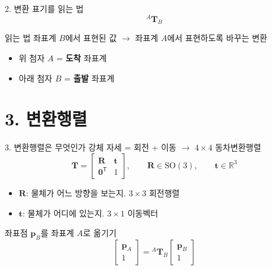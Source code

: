 \documentclass[aspectratio=169,11pt]{beamer}
\begin{document}
\begin{frame}{2. 변환 표기를 읽는 법}
  \[
    {}^{A}\mathbf{T}_{B}
  \]
  \begin{block}{읽는 법}
    좌표계 $B$에서 표현된 값 $\rightarrow$ 좌표계 $A$에서 표현하도록 바꾸는 변환
  \end{block}
  \vfill
  \begin{itemize}
    \item 위 첨자 $A$ = \textbf{도착} 좌표계
    \item 아래 첨자 $B$ = \textbf{출발} 좌표계
  \end{itemize}
\end{frame}

\section{3. 변환행렬}

\begin{frame}{3. 변환행렬은 무엇인가}
  강체 자세 = 회전 + 이동 $\rightarrow$ $4 \times 4$ 동차변환행렬
  \[
    \mathbf{T}
    =
    \begin{bmatrix}
      \mathbf{R} & \mathbf{t} \\
      \mathbf{0}^{\mathsf T} & 1
    \end{bmatrix},
    \qquad
    \mathbf{R}\in\mathrm{SO}(3),
    \qquad
    \mathbf{t}\in\mathbb{R}^{3}
  \]
  \begin{itemize}
    \item $\mathbf{R}$: 물체가 어느 방향을 보는지. $3 \times 3$ 회전행렬
    \item $\mathbf{t}$: 물체가 어디에 있는지. $3 \times 1$ 이동벡터
  \end{itemize}
  \vfill
  좌표점 $\mathbf{p}_B$를 좌표계 $A$로 옮기기
  \[
    \begin{bmatrix} \mathbf{p}_A \\ 1 \end{bmatrix}
    =
    {}^{A}\mathbf{T}_{B}
    \begin{bmatrix} \mathbf{p}_B \\ 1 \end{bmatrix}
  \]
\end{frame}
\end{document}
